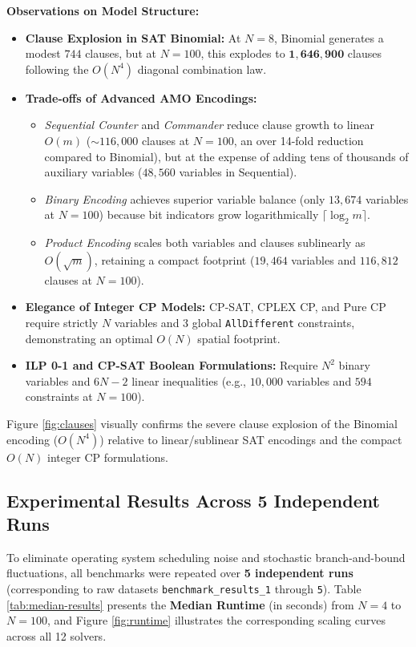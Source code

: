 \documentclass[a4paper,11pt]{article}
\begin{document}
\noindent \textbf{Observations on Model Structure:}
\begin{itemize}
    \item \textbf{Clause Explosion in SAT Binomial:} At $N=8$, Binomial generates a modest $744$ clauses, but at $N=100$, this explodes to $\mathbf{1,646,900}$ clauses following the $O(N^4)$ diagonal combination law.
    \item \textbf{Trade-offs of Advanced AMO Encodings:}
    \begin{itemize}
        \item \textit{Sequential Counter} and \textit{Commander} reduce clause growth to linear $O(m)$ ($\sim 116,000$ clauses at $N=100$, an over 14-fold reduction compared to Binomial), but at the expense of adding tens of thousands of auxiliary variables ($48,560$ variables in Sequential).
        \item \textit{Binary Encoding} achieves superior variable balance (only $13,674$ variables at $N=100$) because bit indicators grow logarithmically $\lceil \log_2 m \rceil$.
        \item \textit{Product Encoding} scales both variables and clauses sublinearly as $O(\sqrt{m})$, retaining a compact footprint ($19,464$ variables and $116,812$ clauses at $N=100$).
    \end{itemize}
    \item \textbf{Elegance of Integer CP Models:} CP-SAT, CPLEX CP, and Pure CP require strictly $N$ variables and 3 global \texttt{AllDifferent} constraints, demonstrating an optimal $O(N)$ spatial footprint.
    \item \textbf{ILP 0-1 and CP-SAT Boolean Formulations:} Require $N^2$ binary variables and $6N-2$ linear inequalities (e.g., $10,000$ variables and $594$ constraints at $N=100$).
\end{itemize}

Figure \ref{fig:clauses} visually confirms the severe clause explosion of the Binomial encoding ($O(N^4)$) relative to linear/sublinear SAT encodings and the compact $O(N)$ integer CP formulations.

\subsection{Experimental Results Across 5 Independent Runs}

To eliminate operating system scheduling noise and stochastic branch-and-bound fluctuations, all benchmarks were repeated over \textbf{5 independent runs} (corresponding to raw datasets \texttt{benchmark\_results\_1} through \texttt{5}). Table \ref{tab:median-results} presents the \textbf{Median Runtime} (in seconds) from $N = 4$ to $N = 100$, and Figure \ref{fig:runtime} illustrates the corresponding scaling curves across all 12 solvers.
\end{document}
